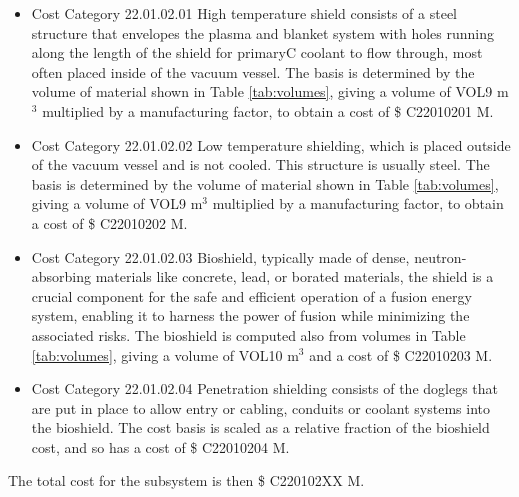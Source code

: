 \begin{itemize}
    \item Cost Category 22.01.02.01 High temperature shield consists of a steel structure that envelopes the plasma and blanket system with holes running along the length of the shield for primaryC coolant to flow through, most often placed inside of the vacuum vessel. The basis is determined by the volume of material shown in Table \ref{tab:volumes}, giving a volume of VOL9  m$^{3}$ multiplied by a manufacturing factor, to obtain a cost of \$ C22010201 M. %
    \item Cost Category 22.01.02.02 Low temperature shielding, which is placed outside of the vacuum vessel and is not cooled.  This structure is usually steel.  The basis is determined by the volume of material shown in Table \ref{tab:volumes}, giving a volume of VOL9  m$^{3}$ multiplied by a manufacturing factor, to obtain a cost of \$ C22010202 M.
    \item Cost Category 22.01.02.03 Bioshield, typically made of dense, neutron-absorbing materials like concrete, lead, or borated materials, the shield is a crucial component for the safe and efficient operation of a fusion energy system, enabling it to harness the power of fusion while minimizing the associated risks.  The bioshield is computed also from volumes in Table \ref{tab:volumes}, giving a volume of VOL10 m$^{3}$ and a cost of \$ C22010203 M. 
    \item Cost Category 22.01.02.04 Penetration shielding consists of the doglegs that are put in place to allow entry or cabling, conduits or coolant systems into the bioshield.  The cost basis is scaled as a relative fraction of the bioshield cost, and so has a cost of \$ C22010204 M.
\end{itemize}

The total cost for the subsystem is then \$ C220102XX M.




